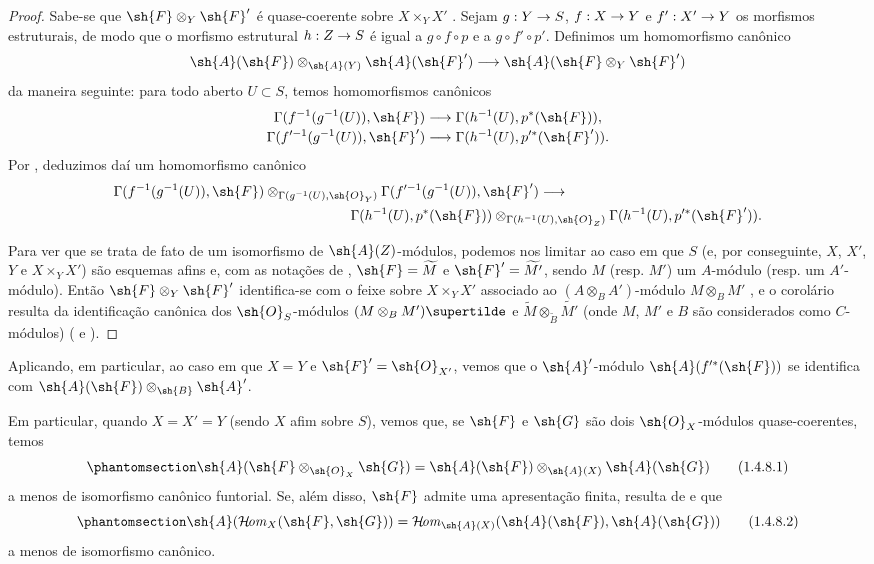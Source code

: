 \documentclass[oneside,10pt]{amsart}
\makeatletter
\newcommand{\ega@arrow}[2]{\mathchoice{#1}{#2}{#2}{#2}}
\renewcommand{\to}{\ega@arrow{\longrightarrow}{\rightarrow}}
\def\shHom{\mathcal{H}\!\mathit{om}}
\newcommand{\oldpage}[2][]{\marginnote{\normalfont\footnotesize\textbf{#1}~|~#2}\ignorespaces}
\let\EGAOriginalLabel\label
\renewcommand{\label}[1]{\phantomsection\EGAOriginalLabel{#1}}
\makeatother
\begin{document}
\begin{proof}
Sabe-se que $\sh{F}\otimes_Y\sh{F}'$ é quase-coerente sobre $X\times_Y X'$ .
Sejam $g:Y\to S$, $f:X\to Y$ e $f':X'\to Y$ os morfismos estruturais, de modo que o morfismo estrutural
\oldpage[II]{11}
$h:Z\to S$ é igual a $g\circ f\circ p$ e a $g\circ f'\circ p'$.
Definimos um homomorfismo canônico
\[
  \sh{A}(\sh{F})\otimes_{\sh{A}(Y)}\sh{A}(\sh{F}')
  \to
  \sh{A}(\sh{F}\otimes_Y\sh{F}')
\]
da maneira seguinte: para todo aberto $U\subset S$, temos homomorfismos canônicos
\[
  \begin{aligned}
  \Gamma(f^{-1}(g^{-1}(U)),\sh{F})
  &\longrightarrow\Gamma(h^{-1}(U),p^*(\sh{F})),
  \\[-2pt]
  \Gamma(f^{\prime-1}(g^{-1}(U)),\sh{F}')
  &\longrightarrow\Gamma(h^{-1}(U),p^{\prime*}(\sh{F}')).
  \end{aligned}
\]
Por , deduzimos daí um homomorfismo canônico
\[
  \begin{aligned}
  &\Gamma(f^{-1}(g^{-1}(U)),\sh{F})
    \otimes_{\Gamma(g^{-1}(U),\sh{O}_Y)}
    \Gamma(f^{\prime-1}(g^{-1}(U)),\sh{F}')\longrightarrow\\
  &\hspace{17em}
    \Gamma(h^{-1}(U),p^*(\sh{F}))
    \otimes_{\Gamma(h^{-1}(U),\sh{O}_Z)}
    \Gamma(h^{-1}(U),p^{\prime*}(\sh{F}')).
  \end{aligned}
\]

Para ver que se trata de fato de um isomorfismo de $\sh{A}(Z)$-módulos, podemos nos limitar ao caso em que $S$ (e, por conseguinte, $X$, $X'$, $Y$ e $X\times_Y X'$) são esquemas afins e, com as notações de , $\sh{F}=\widetilde{M}$ e $\sh{F}'=\widetilde{M'}$, sendo $M$ (resp. $M'$) um $A$-módulo (resp. um $A'$-módulo).
Então $\sh{F}\otimes_Y\sh{F}'$ identifica-se com o feixe sobre $X\times_Y X'$ associado ao $(A\otimes_B A')$-módulo $M\otimes_B M'$ , e o corolário resulta da identificação canônica dos $\sh{O}_S$-módulos $(M\otimes_B M')\supertilde$ e $\widetilde{M}\otimes_{\widetilde{B}}\widetilde{M'}$ (onde $M$, $M'$ e $B$ são considerados como $C$-módulos) ( e ).
\end{proof}

Aplicando, em particular,  ao caso em que $X=Y$ e $\sh{F}'=\sh{O}_{X'}$, vemos que o $\sh{A}'$-módulo $\sh{A}(f^{\prime*}(\sh{F}))$ se identifica com $\sh{A}(\sh{F})\otimes_\sh{B}\sh{A}'$.

\begin{env}[1.4.8]
\label{II.1.4.8}
Em particular, quando $X=X'=Y$ (sendo $X$ afim sobre $S$), vemos que, se $\sh{F}$ e $\sh{G}$ são dois $\sh{O}_X$-módulos quase-coerentes, temos
\[
\label{II.1.4.8.1}
  \sh{A}(\sh{F}\otimes_{\sh{O}_X}\sh{G})
  =\sh{A}(\sh{F})\otimes_{\sh{A}(X)}\sh{A}(\sh{G})
  \tag{1.4.8.1}
\]
a menos de isomorfismo canônico funtorial.
Se, além disso, $\sh{F}$ admite uma apresentação finita, resulta de  e  que
\[
\label{II.1.4.8.2}
  \sh{A}(\shHom_X(\sh{F},\sh{G}))
  =\shHom_{\sh{A}(X)}(\sh{A}(\sh{F}),\sh{A}(\sh{G}))
  \tag{1.4.8.2}
\]
a menos de isomorfismo canônico.
\end{env}
\end{document}
